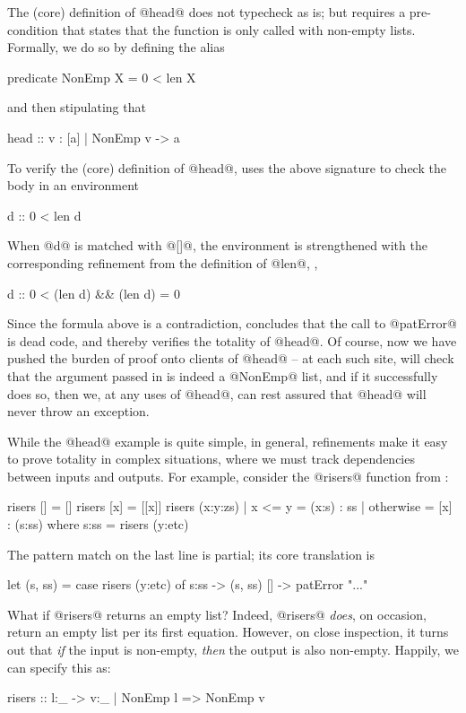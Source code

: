 The (core) definition of @head@ does not typecheck
as is; but requires a pre-condition that states that the function
is only called with non-empty lists. Formally, we do so by 
defining the alias
%
\begin{code}
  predicate NonEmp X = 0 < len X 
\end{code}
%
and then stipulating that 
%
\begin{code}
  head :: {v : [a] | NonEmp v} -> a
\end{code}
%
To verify the (core) definition of @head@, \toolname uses the above signature
to check the body in an environment
%
\begin{code}
  d :: {0 < len d}
\end{code}
%
When @d@ is matched with @[]@, the environment is 
strengthened with the corresponding refinement from 
the definition of @len@, \ie,
%
\begin{code}
  d :: {0 < (len d) && (len d) = 0}
\end{code}
%
Since the formula above is a contradiction, \toolname concludes that the
call to @patError@ is dead code, and thereby verifies the totality 
of @head@. Of course, now we have pushed the burden of proof onto clients
of @head@ -- at each such site, \toolname will check that the argument 
passed in is indeed a @NonEmp@ list, and if it successfully does so, then
we, at any uses of @head@, can rest assured that @head@ will never throw an 
exception. 

While the @head@ example is quite simple, in general, refinements make
it easy to prove totality in complex situations, where we must track
dependencies between inputs and outputs. For example, consider the @risers@
function from \cite{catch}:
%
\begin{code}
  risers []       = []
  risers [x]      = [[x]]
  risers (x:y:zs) 
    | x <= y      = (x:s) : ss 
    | otherwise   = [x] : (s:ss) 
    where 
      s:ss    = risers (y:etc)
\end{code}
%
The pattern match on the last line is partial; its core translation is
%
\begin{code}
  let (s, ss) = case risers (y:etc) of
                  s:ss -> (s, ss)
                  []   -> patError "..."
\end{code}
%
What if @risers@ returns an empty list? 
Indeed, @risers@ \emph{does}, on occasion, return an empty list per its
first equation. However, on close inspection, it turns out that 
\emph{if} the input is non-empty, \emph{then} the output is also
non-empty. Happily, we can specify this as:
%
\begin{code}
  risers :: l:_ -> {v:_ | NonEmp l => NonEmp v} 
\end{code}

